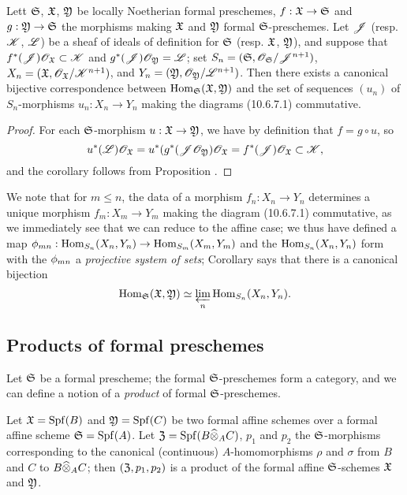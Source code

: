 \begin{cor}[10.6.11]
\label{1.10.6.11}
Lett $\mathfrak{S}$, $\mathfrak{X}$, $\mathfrak{Y}$ be locally Noetherian formal preschemes, $f:\fk{X}\to\fk{S}$ and $g:\fk{Y}\to\fk{S}$ the morphisms making $\mathfrak{X}$ and $\mathfrak{Y}$ formal $\mathfrak{S}$-preschemes.
Let $\mathscr{J}$ (resp. $\mathscr{K}$, $\mathscr{L}$) be a sheaf of ideals of definition for $\mathfrak{S}$ (resp. $\mathfrak{X}$, $\mathfrak{Y}$), and suppose that $f^*(\mathscr{J})\mathscr{O}_\mathfrak{X}\subset\mathscr{K}$ and $g^*(\mathscr{J})\mathscr{O}_\mathfrak{Y}=\mathscr{L}$; set $S_n=(\mathfrak{S},\mathscr{O}_\mathfrak{S}/\mathscr{J}^{n+1})$, $X_n=(\mathfrak{X},\mathscr{O}_\mathfrak{X}/\mathscr{K}^{n+1})$, and $Y_n=(\mathfrak{Y},\mathscr{O}_\mathfrak{Y}/\mathscr{L}^{n+1})$.
Then there exists a canonical bijective correspondence
between ${\mathop{\mathrm{Hom}}\nolimits}_\mathfrak{S}(\mathfrak{X},\mathfrak{Y})$ and the set of sequences $(u_n)$ of $S_n$-morphisms $u_n:X_n\to Y_n$ making the diagrams (10.6.7.1) commutative.
\end{cor}

\begin{proof}
\label{proof-1.10.6.11}
For each $\mathfrak{S}$-morphism $u:\fk{X}\to\fk{Y}$, we have by definition that $f=g\circ u$, so
\[
  u^*(\mathscr{L})\mathscr{O}_\mathfrak{X}=u^*(g^*(\mathscr{J}\mathscr{O}_\mathfrak{Y})\mathscr{O}_\mathfrak{X}=f^*(\mathscr{J})\mathscr{O}_\mathfrak{X}\subset\mathscr{K},
\]
and the corollary follows from Proposition .
\end{proof}

We note that for $m\leqslant n$, the data of a morphism $f_n:X_n\to Y_n$ determines a unique morphism $f_m:X_m\to Y_m$ making the diagram (10.6.7.1) commutative, as we immediately see that we can reduce to the affine case; we thus have defined a map $\vphi_{mn}:\Hom_{S_n}(X_n,Y_n)\to\Hom_{S_m}(X_m,Y_m)$ and the ${\mathop{\mathrm{Hom}}\nolimits}_{S_n}(X_n,Y_n)$ form with the $\phi_{mn}$ a \emph{projective system of sets}; Corollary  says that there is a canonical bijection
\[
  {\mathop{\mathrm{Hom}}\nolimits}_\mathfrak{S}(\mathfrak{X},\mathfrak{Y})\simeq\varprojlim_n{\mathop{\mathrm{Hom}}\nolimits}_{S_n}(X_n,Y_n).
\]

\subsection{Products of formal preschemes}
\label{subsection-products-of-formal-preschemes}

\begin{env}[10.7.1]
\label{1.10.7.1}
Let $\mathfrak{S}$ be a formal prescheme; the formal $\mathfrak{S}$-preschemes form a category, and we can define a notion of a \emph{product} of formal $\mathfrak{S}$-preschemes.
\end{env}

\begin{prop}[10.7.2]
\label{1.10.7.2}
Let $\mathfrak{X}={\mathop{\mathrm{Spf}}\nolimits}(B)$ and $\mathfrak{Y}={\mathop{\mathrm{Spf}}\nolimits}(C)$ be two formal affine schemes over a formal affine scheme $\mathfrak{S}={\mathop{\mathrm{Spf}}\nolimits}(A)$.
Let $\mathfrak{Z}={\mathop{\mathrm{Spf}}\nolimits}(B\widehat{\otimes}_A C)$, $p_1$ and $p_2$ the $\mathfrak{S}$-morphisms corresponding  to the canonical (continuous) $A$-homomorphisms $\rho$ and $\sigma$ from $B$ and $C$ to $B\widehat{\otimes}_A C$; then $(\mathfrak{Z},p_1,p_2)$ is a product of the formal affine $\mathfrak{S}$-schemes $\mathfrak{X}$ and $\mathfrak{Y}$.
\end{prop}

